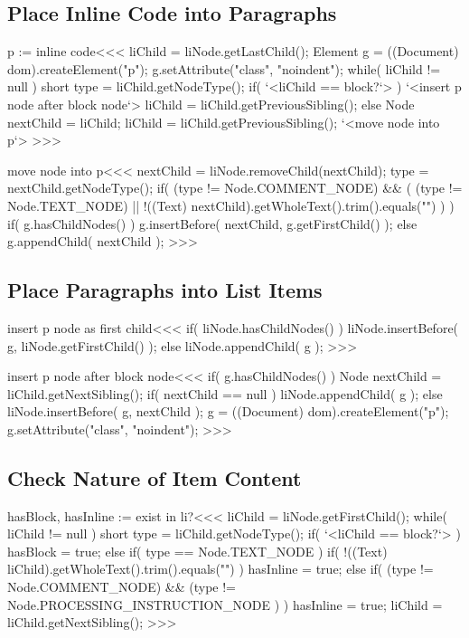 \documentclass{article}
\begin{document}
\subsection{Place Inline Code into Paragraphs}



\<p := inline code\><<<
liChild = liNode.getLastChild();
Element g = ((Document) dom).createElement("p");
g.setAttribute("class", "noindent");
while( liChild != null ){
   short type = liChild.getNodeType();
   if( `<liChild == block?`> ){
      `<insert p node after block node`>
      liChild = liChild.getPreviousSibling();
   } else {            
      Node nextChild = liChild;
      liChild = liChild.getPreviousSibling();
      `<move node into p`>
}  }
>>>


\<move node into p\><<<
nextChild = liNode.removeChild(nextChild);
type = nextChild.getNodeType();
if(
     (type != Node.COMMENT_NODE)
   &&
   (
     (type != Node.TEXT_NODE)
   ||
     !((Text) nextChild).getWholeText().trim().equals("") 
   )
){
   if( g.hasChildNodes() ){
      g.insertBefore( nextChild, g.getFirstChild() );
   } else {
      g.appendChild( nextChild );
} } 
>>>         

\subsection{Place Paragraphs into List Items}

\<insert p node as first child\><<<
if( liNode.hasChildNodes() ){
  liNode.insertBefore( g, liNode.getFirstChild() );
} else {
  liNode.appendChild( g );
}
>>>


\<insert p node after block node\><<<
if( g.hasChildNodes() ){
   Node nextChild = liChild.getNextSibling();
   if( nextChild == null  ){
      liNode.appendChild( g );
   } else {
      liNode.insertBefore( g, nextChild );
   }
   g = ((Document) dom).createElement("p");
   g.setAttribute("class", "noindent");
}
>>>



\subsection{Check Nature of Item Content}

\<hasBlock, hasInline := exist in li?\><<<
liChild = liNode.getFirstChild();
while( liChild != null ){
   short type = liChild.getNodeType();
   if( `<liChild == block?`> ){  hasBlock = true; }
   else if(  type == Node.TEXT_NODE ){ 
      if( !((Text) liChild).getWholeText().trim().equals("") ){
         hasInline = true;
   }  }
   else if( 
       (type != Node.COMMENT_NODE)
       &&
       (type != Node.PROCESSING_INSTRUCTION_NODE )
   ){ 
      hasInline = true;
   }
   liChild = liChild.getNextSibling();
}
>>>
\end{document}
